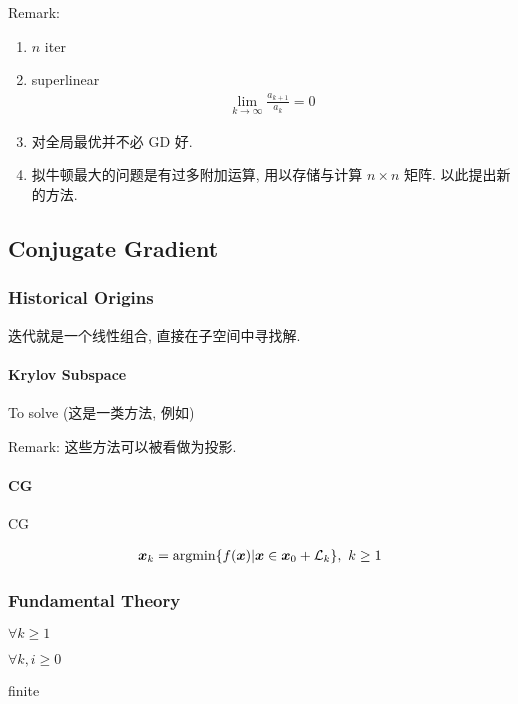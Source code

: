 Remark:
\begin{enumerate}
    \item $n$ iter
    \item superlinear 
    \begin{align*}
        \lim_{k\to\infty}\frac{a_{k+1}}{a_k}=0
    \end{align*}
    \item 对全局最优并不必 GD 好. 
    \item 拟牛顿最大的问题是有过多附加运算, 用以存储与计算 $n\times n$ 矩阵. 以此提出新的方法. 
\end{enumerate}

\subsection{Conjugate Gradient}
\subsubsection{Historical Origins}
迭代就是一个线性组合, 直接在子空间中寻找解. 
\paragraph{Krylov Subspace} To solve (这是一类方法, 例如)

Remark: 这些方法可以被看做为投影. 

\paragraph{CG}CG 

\begin{align*}
    \bm x_k=\operatorname*{argmin}\{ f(\bm x)|\bm x\in \bm x_0+\mathcal{L}_k \},\ k\ge 1
\end{align*}

\subsubsection{Fundamental Theory}

\begin{lemma}
    $\forall k\ge 1$
\end{lemma}

\begin{lemma}
    $\forall k,i\ge 0$
\end{lemma}

\begin{corollary}
    finite
\end{corollary}

